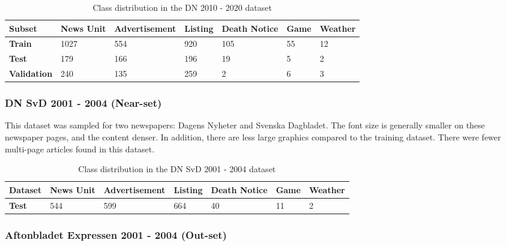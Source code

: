 \documentclass[oneside, english, bibtex]{kththesis}
\begin{document}
\begin{table}[!ht]
  \begin{center}
    \caption{Class distribution in the DN 2010 - 2020 dataset}
    \label{tab:trainclassdist}
    \begin{tabular}{l|l|l|l|l|l|l} %
    \textbf{Subset} & \textbf{News Unit} & \textbf{Advertisement} & \textbf{Listing} & \textbf{Death Notice} & \textbf{Game} & \textbf{Weather}  \\
    \hline
    \textbf{Train} & 1027 & 554 & 920 & 105 & 55 & 12 \\    \hline
    \textbf{Test} & 179 & 166 & 196 & 19 & 5 & 2 \\    \hline
    \textbf{Validation} & 240 & 135 & 259 & 2 & 6 & 3 \\    \hline
    \end{tabular}
  \end{center}
\end{table}

\subsubsection{DN SvD 2001 - 2004 (Near-set)}

This dataset was sampled for two newspapers: Dagens Nyheter and Svenska Dagbladet. The font size is generally smaller on these newspaper pages, and the content denser. In addition, there are less large graphics compared to the training dataset. There were fewer multi-page articles found in this dataset.

\begin{table}[!ht]
  \begin{center}
    \caption{Class distribution in the  DN SvD 2001 - 2004 dataset}
    \label{tab:insetclassdist}
    \begin{tabular}{l|l|l|l|l|l|l} %
    \textbf{Dataset} & \textbf{News Unit} & \textbf{Advertisement} & \textbf{Listing} & \textbf{Death Notice} & \textbf{Game} & \textbf{Weather}  \\
    \hline
    \textbf{Test} & 544 & 599 & 664 & 40 & 11 & 2 \\    \hline
    \end{tabular}
  \end{center}
\end{table}

\subsubsection{Aftonbladet Expressen 2001 - 2004 (Out-set)}
\end{document}
